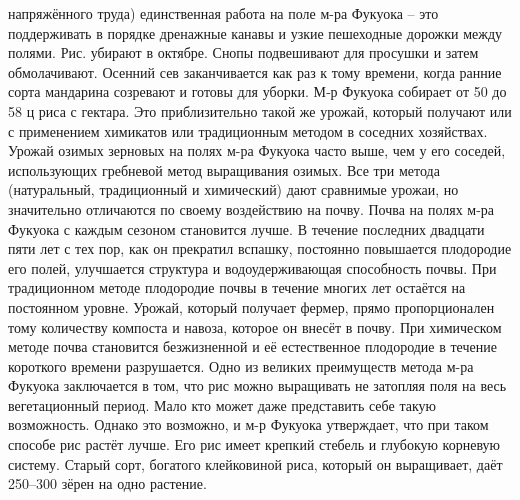 \documentclass[a4paper]{book}
\begin{document}
напряжённого труда) единственная работа на поле м-ра Фукуока – это поддерживать в
порядке дренажные канавы и узкие пешеходные дорожки между полями. Рис. убирают в
октябре. Снопы подвешивают для просушки и затем обмолачивают. Осенний сев
заканчивается как раз к тому времени, когда ранние сорта мандарина созревают и готовы для
уборки. М‑р Фукуока собирает от 50 до 58 ц риса с гектара. Это приблизительно такой же
урожай, который получают или с применением химикатов или традиционным методом в
соседних хозяйствах. Урожай озимых зерновых на полях м-ра Фукуока часто выше, чем у его
соседей, использующих гребневой метод выращивания озимых.
Все три метода (натуральный, традиционный и химический) дают сравнимые урожаи,
но значительно отличаются по своему воздействию на почву. Почва на полях м-ра Фукуока с
каждым сезоном становится лучше. В течение последних двадцати пяти лет с тех пор, как он
прекратил вспашку, постоянно повышается плодородие его полей, улучшается структура и
водоудерживающая способность почвы. При традиционном методе плодородие почвы в
течение многих лет остаётся на постоянном уровне. Урожай, который получает фермер,
прямо пропорционален тому количеству компоста и навоза, которое он внесёт в почву. При
химическом методе почва становится безжизненной и её естественное плодородие в течение
короткого времени разрушается.
Одно из великих преимуществ метода м-ра Фукуока заключается в том, что рис можно
выращивать не затопляя поля на весь вегетационный период. Мало кто может даже
представить себе такую возможность. Однако это возможно, и м-р Фукуока утверждает, что
при таком способе рис растёт лучше. Его рис имеет крепкий стебель и глубокую корневую
систему. Старый сорт, богатого клейковиной риса, который он выращивает, даёт 250–300
зёрен на одно растение.
\end{document}
